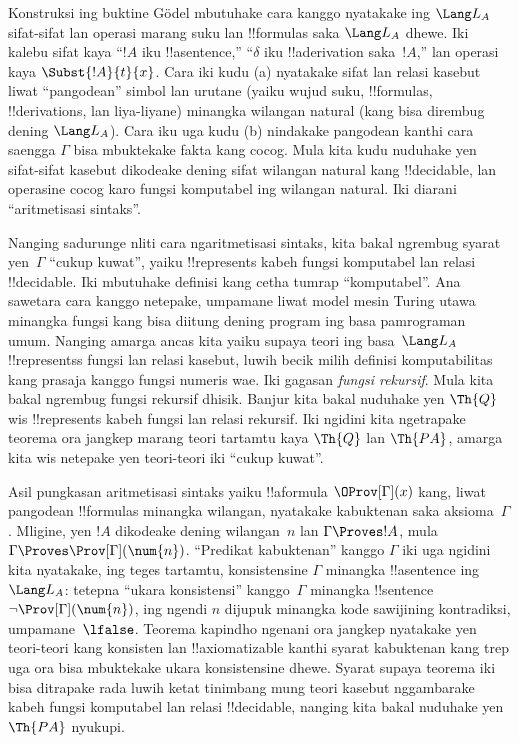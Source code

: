 \documentclass[../../../include/open-logic-section]{subfiles}
\begin{document}
Konstruksi ing buktine G\"odel mbutuhake cara
kanggo nyatakake ing $\Lang L_A$ sifat-sifat
lan operasi marang suku lan !!{formula}s saka
$\Lang L_A$ dhewe. Iki kalebu sifat kaya
``$!A$ iku !!a{sentence},'' ``$\delta$ iku
!!a{derivation} saka~$!A$,'' lan operasi kaya
$\Subst{!A}{t}{x}$. Cara iki kudu (a) nyatakake
sifat lan relasi kasebut liwat ``pangodean''
simbol lan urutane (yaiku wujud suku,
!!{formula}s, !!{derivation}s, lan liya-liyane)
minangka wilangan natural (kang bisa dirembug
dening $\Lang L_A$). Cara iku uga kudu (b)
nindakake pangodean kanthi cara saengga
$\Gamma$ bisa mbuktekake fakta kang cocog.
Mula kita kudu nuduhake yen sifat-sifat kasebut
dikodeake dening sifat wilangan natural kang
!!{decidable}, lan operasine cocog karo fungsi
komputabel ing wilangan natural. Iki diarani
``aritmetisasi sintaks''.

Nanging sadurunge nliti cara ngaritmetisasi
sintaks, kita bakal ngrembug syarat yen~$\Gamma$
``cukup kuwat'', yaiku !!{represents} kabeh
fungsi komputabel lan relasi !!{decidable}.
Iki mbutuhake definisi kang cetha tumrap
``komputabel''. Ana sawetara cara kanggo
netepake, umpamane liwat model mesin Turing
utawa minangka fungsi kang bisa diitung dening
program ing basa pamrograman umum. Nanging
amarga ancas kita yaiku supaya teori ing
basa~$\Lang L_A$ !!{represents}s fungsi
lan relasi kasebut, luwih becik milih
definisi komputabilitas kang prasaja kanggo
fungsi numeris wae. Iki gagasan
\emph{fungsi rekursif}. Mula kita bakal
ngrembug fungsi rekursif dhisik. Banjur kita
bakal nuduhake yen $\Th{Q}$ wis
!!{represents} kabeh fungsi lan relasi
rekursif. Iki ngidini kita ngetrapake
teorema ora jangkep marang teori tartamtu
kaya $\Th{Q}$ lan $\Th{PA}$, amarga kita
wis netepake yen teori-teori iki ``cukup kuwat''.

Asil pungkasan aritmetisasi sintaks yaiku
!!a{formula} $\OProv[\Gamma](x)$ kang,
liwat pangodean !!{formula}s minangka wilangan,
nyatakake kabuktenan saka aksioma~$\Gamma$.
Mligine, yen $!A$ dikodeake dening wilangan~$n$
lan $\Gamma \Proves !A$, mula
$\Gamma \Proves \Prov[\Gamma](\num{n})$.
``Predikat kabuktenan'' kanggo $\Gamma$ iki
uga ngidini kita nyatakake, ing teges tartamtu,
konsistensine $\Gamma$ minangka
!!a{sentence} ing~$\Lang L_A$:
tetepna ``ukara konsistensi'' kanggo~$\Gamma$
minangka !!{sentence}
$\lnot \Prov[\Gamma](\num{n})$, ing ngendi
$n$ dijupuk minangka kode sawijining
kontradiksi, umpamane~$\lfalse$. Teorema
kapindho ngenani ora jangkep nyatakake yen
teori-teori kang konsisten lan !!{axiomatizable}
kanthi syarat kabuktenan kang trep uga ora bisa
mbuktekake ukara konsistensine
dhewe. Syarat supaya teorema iki bisa
ditrapake rada luwih ketat tinimbang mung
teori kasebut nggambarake kabeh fungsi
komputabel lan relasi !!{decidable}, nanging
kita bakal nuduhake yen $\Th{PA}$ nyukupi.
\end{document}
